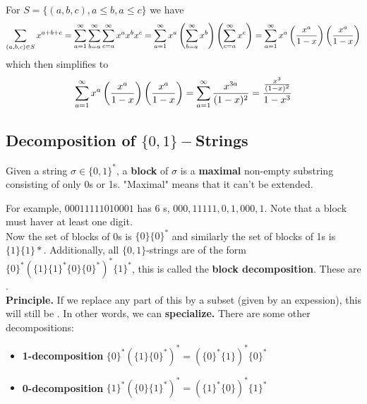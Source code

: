 \documentclass[english, 11pt]{article}
\begin{document}
     \begin{rem}
       For $S = \{(a,b,c), a \leq b, a \leq c \}$ we have
       \[ \sum_{(a,b,c) \in S} x^{a+b+c} = \sum_{a = 1}^{\infty} \sum_{b = a}^{\infty} \sum_{c=a}^{\infty} x^a x^b x^c = \sum_{a=1}^{\infty}x^a \left( \sum_{b = a}^{\infty} x^b \right)\left( \sum_{c =a}^{\infty} x^c \right) = \sum_{a =1}^{\infty} x^a \left( \frac{x^a}{1-x}  \right)\left( \frac{x^a}{1-x} \right)\]
       which then simplifies to
       \[ \sum_{a =1}^{\infty} x^a \left( \frac{x^a}{1-x}  \right)\left( \frac{x^a}{1-x} \right) = \sum_{a = 1}^{\infty} \frac{x^{3a}}{(1-x)^2} = \frac{\frac{x^3}{(1-x)^2}}{1-x^3} \]
     \end{rem}

     \subsection{Decomposition of $\{0,1\}-$Strings}

     \begin{defn}[block]\label{block}
     Given a string $\sigma \in \{0,1\}^*$, a \textbf{block} of $\sigma$ is a \textbf{maximal} non-empty substring consisting of only 0s or 1s. "Maximal" means that it can't be extended.
     \end{defn}

     For example, $00011111010001$ has 6 s, $000,11111,0,1,000,1$. Note that a block must haver at least one digit. \\

     Now the set of blocks of 0s is $\{0\}\{0\}^*$ and similarly the set of blocks of 1s is $\{1\}\{1\}*$. Additionally, all $\{0,1\}$-strings are of the form $\{0\}^* \left( \{1\}\{1\}^* \{0\}\{0\}^*\right)^*\{1\}^*$, this is called the \textbf{block decomposition}. These are . \\

     \textbf{Principle.}
       If we replace any part of this by a subset (given by an  expession), this will still be . In other words, we can \textbf{specialize.} There are some other decompositions:

       \begin{itemize}
         \item \textbf{1-decomposition} $\{0\}^* ( \{1\}\{0\}^*)^* = (\{0\}^*\{1\})^*\{0\}^*$
         \item \textbf{0-decomposition} $\{1\}^* ( \{0\}\{1\}^*)^* = (\{1\}^*\{0\})^*\{1\}^*$
       \end{itemize}
\end{document}

